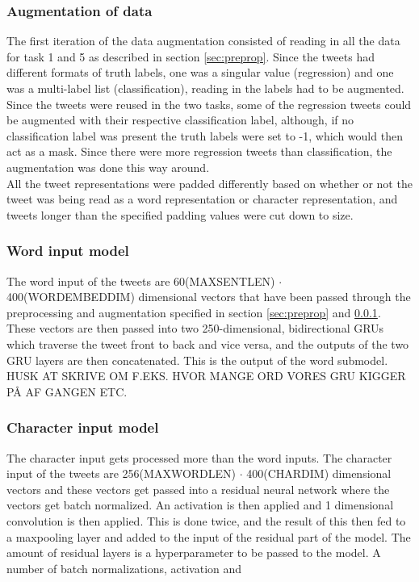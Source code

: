 \subsubsection{Augmentation of data} \label{sec:augm}
The first iteration of the data augmentation consisted of reading in all the data for task 1 and 5 as described in section \ref{sec:preprop}. Since the tweets had different formats of truth labels, one was a singular value (regression) and one was a multi-label list (classification), reading in the labels had to be augmented. Since the tweets were reused in the two tasks, some of the regression tweets could be augmented with their respective classification label, although, if no classification label was present the truth labels were set to -1, which would then act as a mask. Since there were more regression tweets than classification, the augmentation was done this way around.\\
All the tweet representations were padded differently based on whether or not the tweet was being read as a word representation or character representation, and tweets longer than the specified padding values were cut down to size. 

\subsubsection{Word input model}
The word input of the tweets are 60(MAXSENTLEN) $\cdot$ 400(WORDEMBEDDIM) dimensional vectors that have been passed through the preprocessing and augmentation specified in section \ref{sec:preprop} and \ref{sec:augm}. These vectors are then passed into two 250-dimensional, bidirectional GRUs which traverse the tweet front to back and vice versa, and the outputs of the two GRU layers are then concatenated. This is the output of the word submodel.\\
HUSK AT SKRIVE OM F.EKS. HVOR MANGE ORD VORES GRU KIGGER PÅ AF GANGEN ETC.


\subsubsection{Character input model}
The character input gets processed more than the word inputs. The character input of the tweets are 256(MAXWORDLEN) $\cdot$ 400(CHARDIM) dimensional vectors and these vectors get passed into a residual neural network where the vectors get batch normalized. An activation is then applied and 1 dimensional convolution is then applied. This is done twice, and the result of this then fed to a maxpooling layer and added to the input of the residual part of the model. The amount of residual layers is a hyperparameter to be passed to the model. A number of batch normalizations, activation and\\

